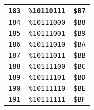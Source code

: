 \begin{multicols}{2}
\begin{center}
\begin{tabular}{|c|c|c|}
 \texttt{183} & \texttt{\%10110111} &  \texttt{\$B7} \\ \hline
 \texttt{184} & \texttt{\%10111000} &  \texttt{\$B8} \\ \hline
 \texttt{185} & \texttt{\%10111001} &  \texttt{\$B9} \\ \hline
 \texttt{186} & \texttt{\%10111010} &  \texttt{\$BA} \\ \hline
 \texttt{187} & \texttt{\%10111011} &  \texttt{\$BB} \\ \hline
 \texttt{188} & \texttt{\%10111100} &  \texttt{\$BC} \\ \hline
 \texttt{189} & \texttt{\%10111101} &  \texttt{\$BD} \\ \hline
 \texttt{190} & \texttt{\%10111110} &  \texttt{\$BE} \\ \hline
 \texttt{191} & \texttt{\%10111111} &  \texttt{\$BF} \\ \hline
\end{tabular}
\end{center}
\end{multicols}

\vspace*{\fill}

\clearpage

\vspace*{\fill}
 
